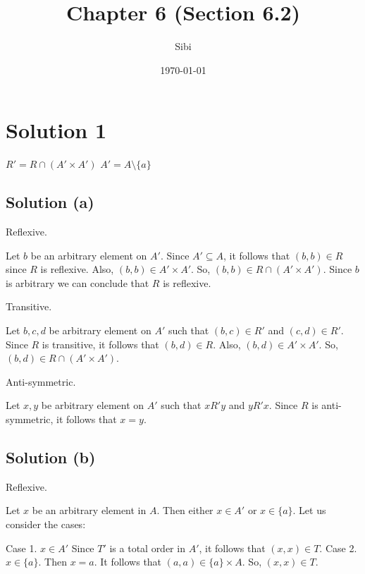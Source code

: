 \documentclass{article}
\begin{document}
\title{Chapter 6 (Section 6.2)}
\author{Sibi}
\date{\today}
\maketitle

\DeclarePairedDelimiter\abs{\lvert}{\rvert}%
\DeclarePairedDelimiter\norm{\lVert}{\rVert}%

\makeatletter
\let\oldabs\abs
\def\abs{\@ifstar{\oldabs}{\oldabs*}}
%
\let\oldnorm\norm
\def\norm{\@ifstar{\oldnorm}{\oldnorm*}}
\makeatother
\newpage

\section{Solution 1}


$R' = R \cap (A' \times A')$
$A' = A \setminus \{a\}$

\subsection{Solution (a)}
Reflexive.

Let $b$ be an arbitrary element on $A'$. Since $A' \subseteq A$, it
follows that $(b,b) \in R$ since $R$ is reflexive. Also,
$(b,b) \in A' \times A'$. So, $(b,b) \in R \cap (A' \times A')$. Since
$b$ is arbitrary we can conclude that $R$ is reflexive.

Transitive.

Let $b,c,d$ be arbitrary element on $A'$ such that $(b,c) \in R'$ and
$(c,d) \in R'$. Since $R$ is transitive, it follows that
$(b,d) \in R$. Also, $(b,d) \in A' \times A'$. So,
$(b,d) \in R \cap (A' \times A')$.

Anti-symmetric.

Let $x,y$ be arbitrary element on $A'$ such that $xR'y$ and $yR'x$.
Since $R$ is anti-symmetric, it follows that $x=y$.

\subsection{Solution (b)}
Reflexive.

Let $x$ be an arbitrary element in $A$. Then either $x \in A'$ or
$x \in \{a\}$. Let us consider the cases:

Case 1. $x \in A'$ Since $T'$ is a total order in $A'$, it follows
that $(x,x) \in T$.
Case 2. $x \in \{a\}$. Then $x = a$. It follows that
$(a,a) \in \{a\} \times A$. So, $(x,x) \in T$.
\end{document}
